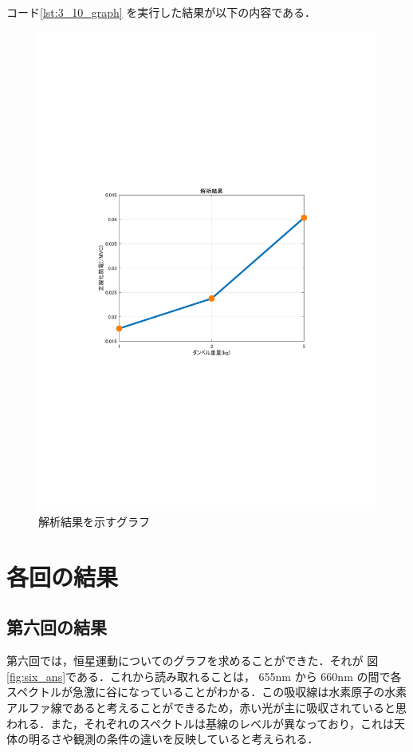 \documentclass[dvipdfmx, titlepage, t]{jsarticle}
\begin{document}
    コード\ref{lst:3_10_graph} を実行した結果が以下の内容である．

    \begin{figure}[H]
        \centering
        \includegraphics[trim=90 250 100 250 clip,keepaspectratio, width=\linewidth]{figure/norm_all.pdf}
        \caption{解析結果を示すグラフ}
        \label{fig:norm_all}
    \end{figure}

    \section{各回の結果}

    \subsection{第六回の結果}
    第六回では，恒星運動についてのグラフを求めることができた．それが 図\ref{fig:six_ans}である．これから読み取れることは， 655nm から 660nm の間で各スペクトルが急激に谷になっていることがわかる．この吸収線は水素原子の水素アルファ線であると考えることができるため，赤い光が主に吸収されていると思われる．また，それぞれのスペクトルは基線のレベルが異なっており，これは天体の明るさや観測の条件の違いを反映していると考えられる．
\end{document}
